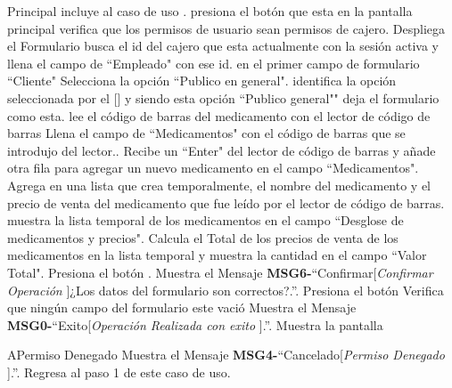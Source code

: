 	\begin{UCtrayectoria}{Principal}
		\UCpaso incluye al caso de uso .
		\UCpaso [\UCactor] presiona el botón  que esta en la pantalla principal 
		\UCpaso verifica que los permisos de usuario sean permisos de cajero. 
		\UCpaso Despliega el Formulario  
		\UCpaso busca el id del cajero que esta actualmente con la sesión activa y llena el campo de ``Empleado" con ese id.
		\UCpaso [\UCactor] en el primer campo de formulario ``Cliente" Selecciona la opción ``Publico en general".
		\UCpaso identifica la opción seleccionada por el [\UCactor] y siendo esta opción ``Publico general"" deja el formulario como esta.
		\UCpaso [\UCactor] lee el código de barras del medicamento con el lector de código de barras
		\UCpaso Llena el campo de ``Medicamentos" con el código de barras que se introdujo del lector..
		\UCpaso Recibe un ``Enter" del lector de código de barras y añade otra fila para agregar un nuevo medicamento en el campo ``Medicamentos".
		\UCpaso Agrega en una lista que crea temporalmente, el nombre del  medicamento y el precio de venta del medicamento que fue leído por el lector de código de barras.
		\UCpaso muestra la lista temporal de los medicamentos en el campo ``Desglose de medicamentos y precios".
		\UCpaso  Calcula el Total de los precios de venta de los medicamentos en la lista temporal y muestra la cantidad en el campo ``Valor Total".
		\UCpaso [\UCactor] Presiona el botón .
		\UCpaso Muestra el Mensaje {\bf MSG6-}``Confirmar[{\em Confirmar Operación }]¿Los datos del formulario son correctos?.''.
		\UCpaso Presiona el botón 
		\UCpaso Verifica que ningún campo del formulario este vació 
		\UCpaso Muestra el Mensaje {\bf MSG0-}``Exito[{\em Operación Realizada con exito }].''.
		\UCpaso Muestra la pantalla 
	\end{UCtrayectoria}

	\begin{UCtrayectoriaA}{A}{Permiso Denegado}
			\UCpaso Muestra el Mensaje {\bf MSG4-}``Cancelado[{\em Permiso Denegado }].''.
			\UCpaso Regresa al paso 1 de este caso de uso.
		\end{UCtrayectoriaA}

